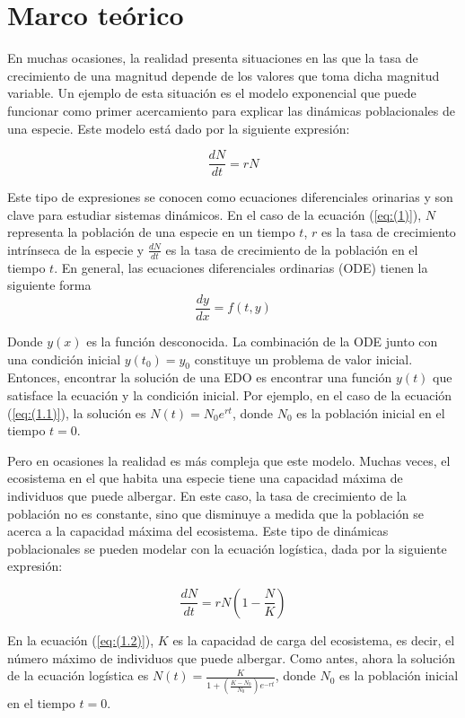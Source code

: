 \documentclass{article}
\begin{document}
\section{Marco teórico}

En muchas ocasiones, la realidad presenta situaciones en las que la tasa de crecimiento de una magnitud depende de los valores que toma dicha magnitud variable. Un ejemplo de esta situación es el modelo exponencial que puede funcionar como primer acercamiento para explicar las dinámicas poblacionales de una especie. Este modelo está dado por la siguiente expresión: 

\begin{equation}
\frac{dN}{dt} = rN  \label{eq:(1.1)}
\end{equation}

Este tipo de expresiones se conocen como ecuaciones diferenciales orinarias y son clave para estudiar sistemas dinámicos. En el caso de la ecuación (\ref{eq:(1)}), \(N\) representa la población de una especie en un tiempo \(t\), \(r\) es la tasa de crecimiento intrínseca de la especie y \(\frac{dN}{dt}\) es la tasa de crecimiento de la población en el tiempo \(t\).
En general, las ecuaciones diferenciales ordinarias (ODE) tienen la siguiente forma
\[
 \frac {dy}{dx} = f(t, y)
\]

Donde $y(x)$ es la función desconocida. La combinación de la ODE junto con una condición inicial $y(t_0) = y_0$ constituye un problema de valor inicial. Entonces, encontrar la solución de una EDO es encontrar una función $y(t)$ que satisface la ecuación y la condición inicial. Por ejemplo, 
en el caso de la ecuación (\ref{eq:(1.1)}), la solución es $N(t) = N_0e^{rt}$, donde $N_0$ es la población inicial en el tiempo $t = 0$.

Pero en ocasiones la realidad es más compleja que este modelo. Muchas veces, el ecosistema en el que habita una especie tiene una capacidad máxima de individuos que puede albergar. En este caso, la tasa de crecimiento de la población no es constante, sino que disminuye a medida que la población se acerca a la capacidad máxima del ecosistema. Este tipo de dinámicas poblacionales se pueden modelar con la ecuación logística, dada por la siguiente expresión:

\begin{equation}
\frac{dN}{dt} = rN \left(1 - \frac{N}{K}\right) \label{eq:(1.2)}
\end{equation}

En la ecuación (\ref{eq:(1.2)}), \(K\) es la capacidad de carga del ecosistema, es decir, el número máximo de individuos que puede albergar. Como antes, ahora la solución de la ecuación logística es \(N(t) = \frac{K}{1 + \left(\frac{K - N_0}{N_0}\right)e^{-rt}}\), donde \(N_0\) es la población inicial en el tiempo \(t = 0\).
\end{document}
